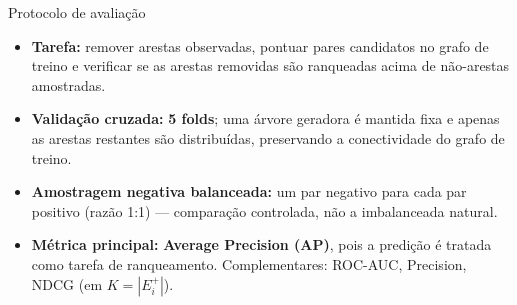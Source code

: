 \documentclass[aspectratio=169,11pt]{beamer}
\providecommand{\EspacoAposTitulo}{\vspace*{0.93cm}}
\providecommand{\EspacoEntreTopicos}{0.29cm}
\newcommand{\dest}[1]{\textcolor{modTeal}{\textbf{#1}}}
\begin{document}
\begin{frame}[t]{Protocolo de avaliação}

  \EspacoAposTitulo

  \begin{itemize}
    \setlength{\itemsep}{\EspacoEntreTopicos}

    \item \textbf{Tarefa:} remover arestas observadas, pontuar pares
    candidatos no grafo de treino e verificar se as arestas removidas
    são ranqueadas acima de não-arestas amostradas.

    \item \textbf{Validação cruzada:} \dest{5 folds}; uma árvore geradora
    é mantida fixa e apenas as arestas restantes são distribuídas,
    preservando a conectividade do grafo de treino.

    \item \textbf{Amostragem negativa balanceada:} um par negativo para
    cada par positivo (razão 1:1) — comparação controlada, não a
    imbalanceada natural.

    \item \textbf{Métrica principal:} \dest{Average Precision (AP)},
    pois a predição é tratada como tarefa de ranqueamento.
    Complementares: ROC-AUC, Precision, NDCG (em $K=|E_i^+|$).
  \end{itemize}

\end{frame}
\end{document}
